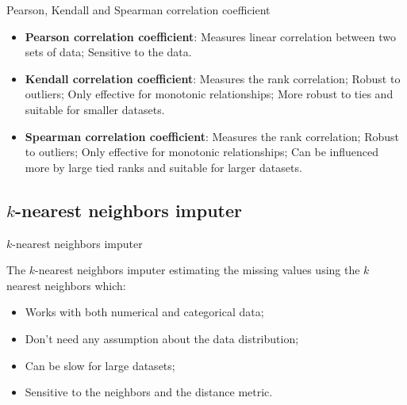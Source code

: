 \documentclass{beamer}
\begin{document}
\begin{frame}{Pearson, Kendall and Spearman correlation coefficient}

  \begin{itemize}
    \item \textbf{Pearson correlation coefficient}: Measures linear correlation between two sets of data; Sensitive to the data. \vspace{.25cm}
    \item \textbf{Kendall correlation coefficient}: Measures the rank correlation; Robust to outliers; Only effective for monotonic relationships; More robust to ties and suitable for smaller datasets. \vspace{.25cm}
    \item \textbf{Spearman correlation coefficient}: Measures the rank correlation; Robust to outliers; Only effective for monotonic relationships; Can be influenced more by large tied ranks and suitable for larger datasets. \vspace{.25cm}
  \end{itemize}

\end{frame}

\subsection{$k$-nearest neighbors imputer}

\begin{frame}{$k$-nearest neighbors imputer}

  The $k$-nearest neighbors imputer estimating the missing values using the $k$ nearest neighbors which: \vspace{.25cm}

  \begin{itemize}
    \item Works with both numerical and categorical data; \vspace{.25cm}
    \item Don't need any assumption about the data distribution; \vspace{.25cm}
    \item Can be slow for large datasets; \vspace{.25cm}
    \item Sensitive to the neighbors and the distance metric. \vspace{.25cm}
  \end{itemize}

\end{frame}
\end{document}

